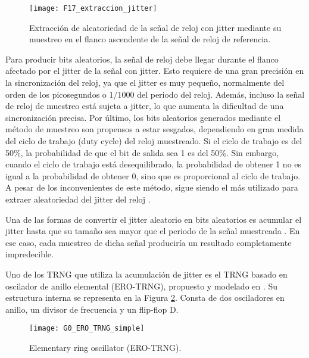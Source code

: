                 \begin{figure}[hbtp]
                    \caption{Extracción de aleatoriedad de la señal de reloj con jitter mediante su muestreo en el flanco ascendente de la señal de reloj de referencia.}
                    \centering
                    \texttt{[image: F17\_extraccion\_jitter]}
                    \label{fig:F17_extraccion_jitter}
                \end{figure}

                Para producir bits aleatorios, la señal de reloj debe llegar durante el flanco afectado por el jitter de la señal con jitter. Esto requiere de una gran precisión en la sincronización del reloj, ya que el jitter es muy pequeño, normalmente del orden de los picosegundos o $1/1000$ del periodo del reloj. Además, incluso la señal de reloj de muestreo está sujeta a jitter, lo que aumenta la dificultad de una sincronización precisa. Por último, los bits aleatorios generados mediante el método de muestreo son propensos a estar sesgados, dependiendo en gran medida del ciclo de trabajo (duty cycle) del reloj muestreado. Si el ciclo de trabajo es del 50\%, la probabilidad de que el bit de salida sea 1 es del 50\%. Sin embargo, cuando el ciclo de trabajo está desequilibrado, la probabilidad de obtener 1 no es igual a la probabilidad de obtener 0, sino que es proporcional al ciclo de trabajo. A pesar de los inconvenientes de este método, sigue siendo el más utilizado para extraer aleatoriedad del jitter del reloj \cite{Sunar2007,Baudet2010,Rozic2015,Cherkaoui2013, Zhang2018}.

                Una de las formas de convertir el jitter aleatorio en bits aleatorios es acumular el jitter hasta que su tamaño sea mayor que el periodo de la señal muestreada \cite{Baudet2010}. En ese caso, cada muestreo de dicha señal produciría un resultado completamente impredecible.

                Uno de los TRNG que utiliza la acumulación de jitter es el TRNG basado en oscilador de anillo elemental (ERO-TRNG), propuesto y modelado en \cite{Baudet2010}. Su estructura interna se representa en la Figura \ref{fig:G0_ERO_TRNG_simple}. Consta de dos osciladores en anillo, un divisor de frecuencia y un flip-flop D.

                \begin{figure}[hbtp]
                    \caption{Elementary ring oscillator (ERO-TRNG).}
                    \centering
                    \texttt{[image: G0\_ERO\_TRNG\_simple]}
                    \label{fig:G0_ERO_TRNG_simple}
                \end{figure}

